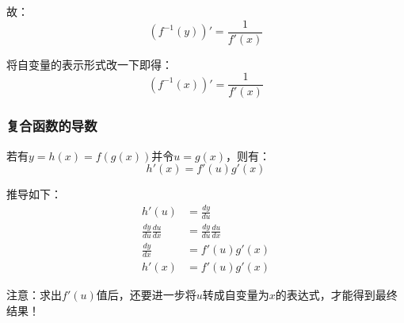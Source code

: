 \documentclass[12pt]{article}
\begin{document}
故：\\

\begin{equation*}
(f^{-1}(y))' = \frac{1}{f'(x)}
\end{equation*}

将自变量的表示形式改一下即得：\\

\begin{equation*}
(f^{-1}(x))' = \frac{1}{f'(x)}
\end{equation*}

\subsubsection{复合函数的导数}

若有$y = h(x) = f(g(x))$并令$u = g(x)$，则有：\\

\begin{equation*}
h'(x) = f'(u)g'(x)
\end{equation*}

推导如下：\\

\begin{equation*}
\begin{aligned}
h'(u) &= \frac{dy}{du}\\
\frac{dy}{du}\frac{du}{dx} &= \frac{dy}{du}\frac{du}{dx}\\
\frac{dy}{dx} &= f'(u)g'(x)\\
h'(x) &= f'(u)g'(x)
\end{aligned}
\end{equation*}

注意：求出$f'(u)$值后，还要进一步将$u$转成自变量为$x$的表达式，才能得到最终结果！
\end{document}
